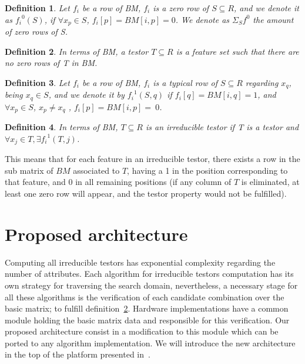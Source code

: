 \documentclass[conference]{IEEEtran}
\newtheorem{definition}{Definition}
\begin{document}
\begin{definition} \label{def21} Let $f_i$ be a row of BM, $f_i$ is a zero row of $S \subseteq R$, and we denote it as ${f_i}^0 (S)$, if $\forall x_p \in S$, $f_i [p] = BM [i, p] = 0$. We denote as $\Sigma_S f^0$  the amount of zero rows of S.
\end{definition}
\begin{definition} \label{def22} In terms of BM, a testor $T \subseteq R$ is a feature set such that there
are no zero rows of T in BM. 
\end{definition}
\begin{definition} \label{def23} Let $f_i$ be a row of BM, $f_i$ is a typical row of $S \subseteq R$ regarding $x_q$, being $x_q \in S$, and we denote it by ${f_i}^1 (S,q)$ if $f_i [q] = BM [i, q] = 1$, and $\forall x_p \in S$, $x_p \neq x_q$ , $f_i [p] = BM [i, p] =~0$.
\end{definition}

\begin{definition} \label{def24} In terms of BM, $T \subseteq R$ is an irreducible testor if T is a testor and
$\forall x_j \in T, \exists {f_i}^1 (T, j)$.
\end{definition}

This means that for each feature in an irreducible testor, there exists a row in 
the sub matrix of $BM$ associated to $T$, having a 1 in the position corresponding
to that feature, and 0 in all remaining positions (if any column of $T$ is eliminated, 
at least one zero row will appear, and the testor property would not be fulfilled). 

\section{Proposed architecture}
\label{sect:3}

Computing all irreducible testors has exponential complexity regarding the number of attributes. Each 
algorithm for irreducible testors computation has its own strategy for traversing the search domain, 
nevertheless, a necessary stage for all these algorithms is the verification of each candidate combination 
over the basic matrix; to fulfill definition~\ref{def22}. Hardware implementations have a common module 
holding the basic matrix data and responsible for this verification. Our proposed architecture consist in 
a modification to this module which can be ported to any algorithm implementation. We will introduce the 
new architecture in the top of the platform presented in~\cite{Rojas12}.
\end{document}
